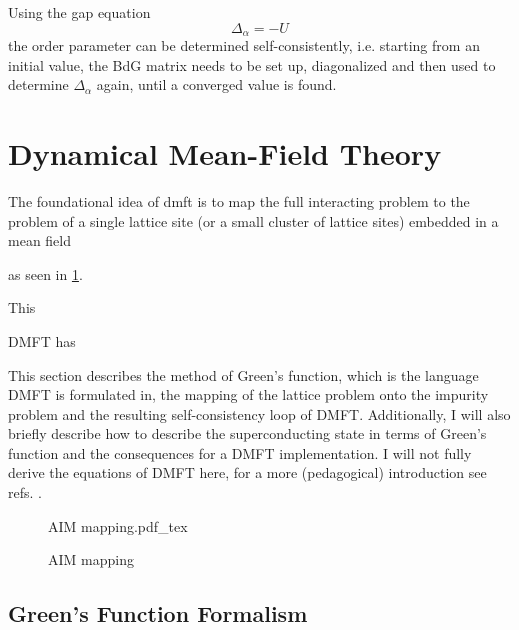 \documentclass[../notes.tex]{subfiles}
\begin{document}

Using the gap equation
\begin{equation}
	\Delta_{\alpha} = -U
\end{equation}
the order parameter can be determined self-consistently, i.e. starting from an initial value, the BdG matrix needs to be set up, diagonalized and then used to determine \(\Delta_{\alpha}\) again, until a converged value is found.


\section{Dynamical Mean-Field Theory}\label{sec:Dynamical Mean-Field Theory}

The foundational idea of \acrfull{dmft} is to map the full interacting problem to the problem of a single lattice site (or a small cluster of lattice sites) embedded in a mean field

as seen in \cref{fig:DMFT AIM mapping}.

This 


DMFT has

	
This section describes the method of Green's function, which is the language DMFT is formulated in, the mapping of the lattice problem onto the impurity problem and the resulting self-consistency loop of DMFT.
Additionally, I will also briefly describe how to describe the superconducting state in terms of Green's function and the consequences for a DMFT implementation.
I will not fully derive the equations of DMFT here, for a more (pedagogical) introduction see refs. \cite{pavariniDynamicalMeanfieldTheory2022, georgesDynamicalMeanfieldTheory1996, colemanIntroductionManyBodyPhysics2015, bruusManyBodyQuantumTheory2004}.

\begin{figure}[t]
	\centering
	{AIM mapping.pdf_tex}
	\caption{AIM mapping}
	\label{fig:DMFT AIM mapping}
\end{figure}

\subsection*{Green's Function Formalism}
\end{document}
